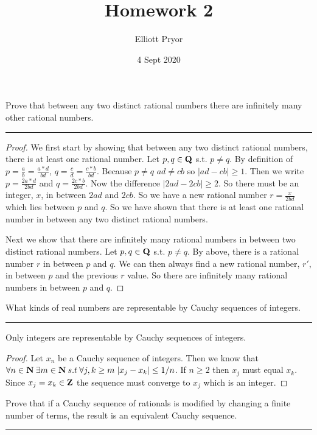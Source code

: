 \documentclass[11pt]{article}
\title{Homework 2}
\author{Elliott Pryor}
\date{4 Sept 2020}
\begin{document}
\maketitle

Prove that between any two distinct rational numbers there are infinitely many other rational numbers.
\hrule

\begin{proof}
We first start by showing that between any two distinct rational numbers, there is at least one rational number. Let $p, q \in \mathbf{Q}$ s.t. $p \neq q$. By definition of $p = \frac{a}{b} = \frac{a * d}{bd}$, $q = \frac{c}{d} = \frac{ c * b}{bd}$. Because $p \neq q$ $ad \neq cb$ so $|ad - cb| \geq 1$. Then we write $p = \frac{2a * d}{2bd}$ and $q = \frac{2 c * b}{2bd}$. Now the difference $|2ad - 2 cb| \geq 2$. So there must be an integer, $x$, in between $2ad$ and $2cb$.  So we have a new rational number $r = \frac{x}{2bd}$ which lies between $p$ and $q$. So we have shown that there is at least one rational number in between any two distinct rational numbers.

Next we show that there are infinitely many rational numbers in between two distinct rational numbers. Let $p, q \in \mathbf{Q}$ s.t. $p \neq q$. By above, there is a rational number $r$ in between $p$ and $q$. We can then always find a new rational number, $r'$, in between $p$ and the previous $r$ value. So there are infinitely many rational numbers in between $p$ and $q$.

\end{proof}




\newpage
{}
What kinds of real numbers are representable by Cauchy sequences of integers.
\hrule

Only integers are representable by Cauchy sequences of integers. 

\begin{proof} 

Let $x_n$ be a Cauchy sequence of integers. Then we know that $\forall n \in \mathbf{N} \: \exists m \in \mathbf{N} \: s.t \: \forall j,k \geq m \; |x_j - x_k| \leq 1/n$. If $n \geq 2$ then $x_j$ must equal $x_k$. Since $x_j = x_k \in \mathbf{Z}$ the sequence must converge to $x_j$ which is an integer.
\end{proof}




\newpage
{}
Prove that if a Cauchy sequence of rationals is modified by changing a finite number of terms, the result is an equivalent Cauchy sequence.
\hrule
\end{document}
